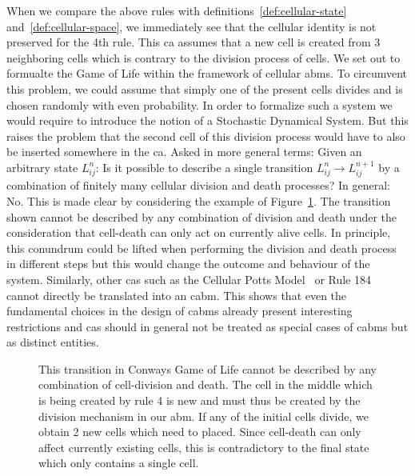 When we compare the above rules with definitions~\ref{def:cellular-state}
and~\ref{def:cellular-space}, we immediately see that the cellular identity is not preserved for the
4th rule.
This \ac{ca} assumes that a new cell is created from 3 neighboring cells which is contrary to the
division process of cells.
We set out to formualte the Game of Life within the framework of cellular \acp{abm}.
To circumvent this problem, we could assume that simply one of the present cells divides and is
chosen randomly with even probability.
In order to formalize such a system we would require to introduce the notion of a
Stochastic Dynamical System.
But this raises the problem that the second cell of this division process would have to also be
inserted somewhere in the \ac{ca}.
Asked in more general terms: Given an arbitrary state $L^n_{ij}$:
Is it possible to describe a single transition $L^n_{ij}\rightarrow L^{n+1}_{ij}$ by a combination
of finitely many cellular division and death processes?
In general: No.
This is made clear by considering the example of Figure~\ref{fig:conway-non-abm-transition}.
The transition shown cannot be described by any combination of division and death under the
consideration that cell-death can only act on currently alive cells.
In principle, this conundrum could be lifted when performing the division and death process in
different steps but this would change the outcome and behaviour of the system.
Similarly, other \acp{ca} such as the Cellular Potts Model~\cite{Graner1992} or Rule
184~\cite{Krug1988} cannot
directly be translated into an \ac{cabm}.
This shows that even the fundamental choices in the design of \acp{cabm} already present interesting
restrictions and \acp{ca} should in general not be treated as special cases of \acp{cabm} but as
distinct entities.

\begin{figure}
    \centering
    \caption{
        This transition in Conways Game of Life cannot be described by any combination of
        cell-division and death.
        The cell in the middle which is being created by rule 4 is new and must thus be created by
        the division mechanism in our \ac{abm}.
        If any of the initial cells divide, we obtain 2 new cells which need to placed.
        Since cell-death can only affect currently existing cells, this is contradictory to the
        final state which only contains a single cell.
    }
    \label{fig:conway-non-abm-transition}
\end{figure}


